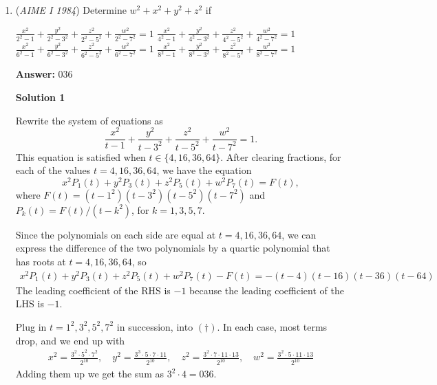 \begin{enumerate}
 If $p$ = $29 \bmod{30}$, p±4 would both be composite

 So $p$ < 30

 From here, just try all possible p and find the answer is $\boxed {038}$

 \href{https://mathproblemsolvingskills.wordpress.com/}{MathProblemSolvingSkills.com}

 


 


	\item (\textit{AIME I 1984}) Determine $w^2+x^2+y^2+z^2$ if


 $\frac{x^2}{2^2-1}+\frac{y^2}{2^2-3^2}+\frac{z^2}{2^2-5^2}+\frac{w^2}{2^2-7^2}=1$
$\frac{x^2}{4^2-1}+\frac{y^2}{4^2-3^2}+\frac{z^2}{4^2-5^2}+\frac{w^2}{4^2-7^2}=1$
$\frac{x^2}{6^2-1}+\frac{y^2}{6^2-3^2}+\frac{z^2}{6^2-5^2}+\frac{w^2}{6^2-7^2}=1$
$\frac{x^2}{8^2-1}+\frac{y^2}{8^2-3^2}+\frac{z^2}{8^2-5^2}+\frac{w^2}{8^2-7^2}=1$

 \textbf{Answer: }036



\textbf{Solution 1}

Rewrite the system of equations as 
 \[\frac{x^{2}}{t-1}+\frac{y^{2}}{t-3^{2}}+\frac{z^{2}}{t-5^{2}}+\frac{w^{2}}{t-7^{2}}=1.\] This equation is satisfied when $t \in \{4, 16, 36, 64\}$. After clearing fractions, for each of the values $t=4,16,36,64$, we have the equation 
 \[x^2P_1(t)+y^2P_3(t)+z^2P_5(t)+w^2P_7(t)=F(t),\]where $F(t)=(t-1^2)(t-3^2)(t-5^2)(t-7^2)$ and $P_k(t)=F(t)/(t-k^2)$, for $k=1,3,5,7$.

 Since the polynomials on each side are equal at $t=4,16,36,64$, we can express the difference of the two polynomials by a quartic polynomial that has roots at $t=4,16,36,64$, so
 \begin{align} \tag{\dag}x^2P_1(t)+y^2P_3(t)+z^2P_5(t)+w^2P_7(t)-F(t) = -(t-4)(t-16)(t-36)(t-64) \end{align}The leading coefficient of the RHS is $-1$ because the leading coefficient of the LHS is $-1$.

 Plug in $t=1^2, 3^2, 5^2, 7^2$ in succession, into $(\dag)$. In each case, most terms drop, and we end up with
 \begin{align*}  x^2=\frac{3^2\cdot 5^2\cdot 7^2}{2^{10}}, \quad y^2=\frac{3^3\cdot 5\cdot 7\cdot 11}{2^{10}},\quad z^2=\frac{3^2\cdot 7\cdot 11\cdot 13}{2^{10}},\quad w^2=\frac{3^2\cdot 5\cdot 11\cdot 13}{2^{10}} \end{align*}
Adding them up we get the sum as $3^2\cdot 4=\boxed{036}$.


\end{enumerate}
